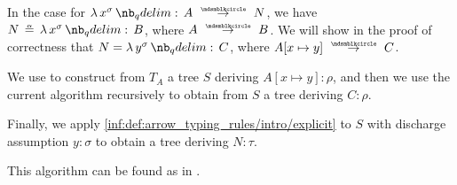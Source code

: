\begin{algorithm}
\begin{thmenum}
\begin{thmenum}
       In the case  for \( \qabs {x^\sigma} A \pred N \), we have \( N \aequiv \qabs {x^\sigma} B \), where \( A \pred B \). We will show in the proof of correctness that \( N = \qabs {y^\sigma} C \), where \( A[x \mapsto y] \pred C \).

      We use  to construct from \( T_A \) a tree \( S \) deriving \( A[x \mapsto y]: \rho \), and then we use the current algorithm recursively to obtain from \( S \) a tree deriving \( C: \rho \).

      Finally, we apply \ref{inf:def:arrow_typing_rules/intro/explicit} to \( S \) with discharge assumption \( y: \sigma \) to obtain a tree deriving \( N: \tau \).
    \end{thmenum}
  \end{thmenum}
\end{algorithm}
\begin{comments}
  \item This algorithm can be found as  in \cite{notebook:code}.
\end{comments}
